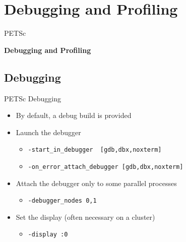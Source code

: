 






%
%
\section{Debugging and Profiling}
\begin{frame}{PETSc}
   \begin{center} \Large \textbf{Debugging and Profiling} \end{center}
\end{frame}

\subsection{Debugging}
\begin{frame}[fragile]{PETSc Debugging}
  \begin{itemize}
  \item By default, a debug build is provided

  \vspace*{0.3cm}
  \item Launch the debugger
  \begin{itemize}
    \item \lstinline|-start_in_debugger  [gdb,dbx,noxterm]|
    \item \lstinline|-on_error_attach_debugger [gdb,dbx,noxterm]|
  \end{itemize}

  \vspace*{0.3cm}
  \item Attach the debugger only to some parallel processes
  \begin{itemize}
    \item \lstinline|-debugger_nodes 0,1|
  \end{itemize}

  \vspace*{0.3cm}
  \item Set the display (often necessary on a cluster)
  \begin{itemize}
    \item \lstinline|-display :0|
  \end{itemize}
\end{itemize}
\end{frame}  

